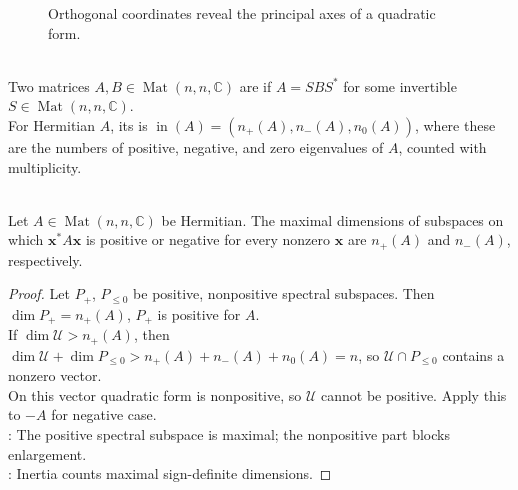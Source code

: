 \begin{figure}[H]
  \centering
  
  \caption{Orthogonal coordinates reveal the principal axes of a quadratic form.}
  \label{fig:quadratic-form-principal-axes}
\end{figure}

\begin{definition} \label{def:star-congruence-and-hermitian-inertia} \\
Two matrices $A,B\in\operatorname{Mat}(n,n,\mathbb{C})$ are  if $A=SBS^*$ for some invertible $S\in\operatorname{Mat}(n,n,\mathbb{C})$.\\
For Hermitian $A$, its  is $\operatorname{in}(A)=(n_+(A),n_-(A),n_0(A))$, where these are the numbers of positive, negative, and zero eigenvalues of $A$, counted with multiplicity.
\end{definition}

\begin{lemma} \label{lem:positive-subspace-dimension-inertia} \\
Let $A\in\operatorname{Mat}(n,n,\mathbb{C})$ be Hermitian. The maximal dimensions of subspaces on which $\mathbf{x}^*A\mathbf{x}$ is positive or negative for every nonzero $\mathbf{x}$ are $n_+(A)$ and $n_-(A)$, respectively.
\begin{proof}
Let $P_+$, $P_{\leq0}$ be positive, nonpositive spectral subspaces. Then $\dim P_+=n_+(A)$, $P_+$ is positive for $A$.\\
If $\dim\mathcal{U}>n_+(A)$, then $\dim\mathcal{U}+\dim P_{\leq0}>n_+(A)+n_-(A)+n_0(A)=n$, so $\mathcal{U}\cap P_{\leq0}$ contains a nonzero vector.\\
On this vector quadratic form is nonpositive, so $\mathcal{U}$ cannot be positive. Apply this to $-A$ for negative case.\\
: The positive spectral subspace is maximal; the nonpositive part blocks enlargement.\\
: Inertia counts maximal sign-definite dimensions.
\end{proof}
\end{lemma}

